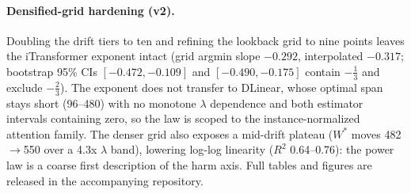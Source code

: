 \paragraph{Densified-grid hardening (v2).}
Doubling the drift tiers to ten and refining the lookback grid to nine points leaves the iTransformer exponent intact (grid argmin slope $-0.292$, interpolated $-0.317$; bootstrap 95\% CIs $[-0.472,-0.109]$ and $[-0.490,-0.175]$ contain $-\tfrac13$ and exclude $-\tfrac23$). The exponent does not transfer to DLinear, whose optimal span stays short (96--480) with no monotone $\lambda$ dependence and both estimator intervals containing zero, so the law is scoped to the instance-normalized attention family. The denser grid also exposes a mid-drift plateau ($W^*$ moves 482$\to$550 over a 4.3x $\lambda$ band), lowering log-log linearity ($R^2$ 0.64--0.76): the power law is a coarse first description of the harm axis. Full tables and figures are released in the accompanying repository.
